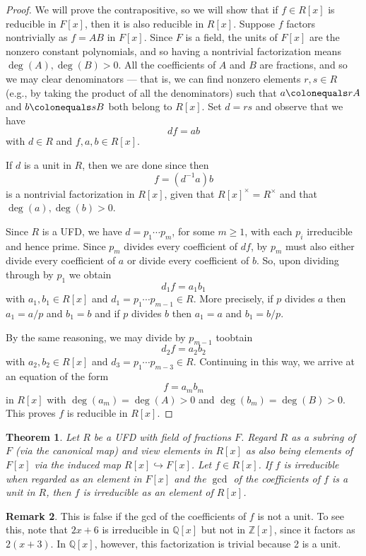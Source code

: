 \documentclass[12pt]{report}
\newtheorem{theorem}{Theorem}[chapter]
\numberwithin{equation}{section}
\numberwithin{theorem}{chapter}
\theoremstyle{definition}
\newtheorem*{basic properties}{Basic Properties}
\newtheorem*{Important Remark}{Important Remark}
\newtheorem{remark}[theorem]{Remark}
\newcommand{\Z}{\mathbb{Z}}
\newcommand{\Q}{\mathbb{Q}}
\begin{document}
\begin{proof}
We will prove the contrapositive, so we will show that if $f \in R[x]$ is reducible in $F[x]$, then it is also reducible in $R[x]$. Suppose $f$ factors nontrivially as $f = AB$ in $F[x]$.
Since $F$ is a field, the units of $F[x]$ are the nonzero constant polynomials, and so having a nontrivial factorization means $\deg(A), \deg(B) > 0$.
All the coefficients of $A$ and $B$ are fractions, and so we may clear denominators --- that is, we can find nonzero elements $r,s \in R$ (e.g., by taking the product of all the denominators) such that $a \colonequals r A$ and $b \colonequals s B$ both belong to $R[x]$.  Set $d = rs$ and observe that we have
$$d f = a b$$
with $d \in R$ and $f,a,b \in R[x]$. 
  

If $d$ is a unit in $R$, then we are done since then 
$$f = (d^{-1}a) b$$
is a nontrivial factorization in $R[x]$, given that $R[x]^\times = R^\times$ and that $\deg(a), \deg(b) > 0$.


Since $R$ is a UFD, we have $d = p_1 \cdots p_m$, for some $m \geqslant 1$, with each $p_i$ irreducible and hence prime.
Since $p_m$ divides every coefficient of $d f$, by  $p_m$ must also either divide every coefficient of $a$ or divide every coefficient of $b$.
So, upon dividing through by $p_1$ we obtain
$$d_1 f = a_1 b_1$$
with $a_1, b_1 \in R[x]$ and $d_1 = p_1 \cdots p_{m-1} \in R$. 
More precisely, if $p$ divides $a$ then $a_1 = a/p$ and $b_1 = b$ and if $p$ divides $b$ then $a_1 = a$ and $b_1 = b/p$.

By the same reasoning, we may divide by $p_{m-1}$ toobtain
$$d_2 f = a_2 b_2$$
with $a_2, b_2 \in R[x]$ and $d_3 = p_1 \cdots p_{m-3}  \in R$. 
Continuing in this way, we arrive at an equation of the form 
$$f = a_m b_m$$ 
in $R[x]$ with $\deg(a_m) = \deg(A) > 0$ and $\deg(b_m) = \deg(B) > 0$. This proves $f$ is reducible in $R[x]$. 
\end{proof}


\begin{theorem}
	Let $R$ be a UFD with field of fractions $F$. Regard $R$ as a subring of $F$ (via the canonical map) and view elements in $R[x]$ as also being elements of $F[x]$ via the induced map $R[x]\hookrightarrow F[x]$.
Let $f \in R[x]$. If $f$ is irreducible when regarded as an element   in $F[x]$ and the $\gcd$ of the coefficients of $f$ is a unit in $R$, then $f$ is  irreducible  as an element of $R[x]$.
\end{theorem}

\begin{remark}
This is false if the gcd of the coefficients of $f$ is not a unit. To see this, note that  $2x + 6$ is irreducible in $\Q[x]$ but not in $\Z[x]$, since it factors as $2(x+3)$. In $\Q[x]$, however, this factorization is trivial because 2 is a unit. 
\end{remark}
\end{document}
